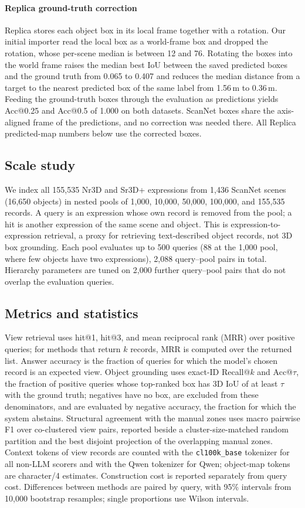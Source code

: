 \documentclass{ieeeaccess}
\begin{document}
\paragraph{Replica ground-truth correction}
Replica stores each object box in its local frame together with a rotation. Our initial importer read the local box as a world-frame box and dropped the
rotation, whose per-scene median is between 12\textdegree{} and
76\textdegree{}. Rotating the boxes into the world frame raises the median best
IoU between the saved predicted boxes and the ground truth from 0.065 to 0.407
and reduces the median distance from a target to the nearest predicted box of the
same label from 1.56\,m to 0.36\,m. Feeding the ground-truth boxes through the
evaluation as predictions yields Acc@0.25 and Acc@0.5 of 1.000 on both datasets.
ScanNet boxes share the axis-aligned frame of the predictions, and no correction
was needed there. All Replica predicted-map numbers below use the corrected
boxes.

\subsection{Scale study}
We index all 155,535 Nr3D and Sr3D+ expressions from 1,436 ScanNet scenes
(16,650 objects) in nested pools of 1,000, 10,000, 50,000, 100,000, and 155,535
records. A query is an expression whose own record is removed from the pool; a
hit is another expression of the same scene and object. This is
expression-to-expression retrieval, a proxy for retrieving text-described object
records, not 3D box grounding. Each pool evaluates up to 500 queries (88 at the
1,000 pool, where few objects have two expressions), 2,088 query--pool pairs in
total. Hierarchy parameters are tuned on 2,000 further query--pool pairs that do
not overlap the evaluation queries.

\subsection{Metrics and statistics}
View retrieval uses hit@1, hit@3, and mean reciprocal rank (MRR) over positive
queries; for methods that return $k$ records, MRR is computed over the returned
list. Answer accuracy is the fraction of queries for which the model's chosen
record is an expected view. Object grounding uses exact-ID Recall@$k$ and
Acc@$\tau$, the fraction of positive queries whose top-ranked box has 3D IoU of at
least $\tau$ with the ground truth; negatives have no box, are excluded from these
denominators, and are evaluated by negative accuracy, the fraction for which the
system abstains. Structural agreement with the manual zones uses macro pairwise
F1 over co-clustered view pairs, reported beside a cluster-size-matched random
partition and the best disjoint projection of the overlapping manual zones.
Context tokens of view records are counted with the \texttt{cl100k\_base}
tokenizer for all non-LLM scorers and with the Qwen tokenizer for Qwen; object-map
tokens are character/4 estimates. Construction cost is reported separately from
query cost. Differences between methods are paired by query, with 95\% intervals
from 10,000 bootstrap resamples; single proportions use Wilson intervals.
\end{document}
